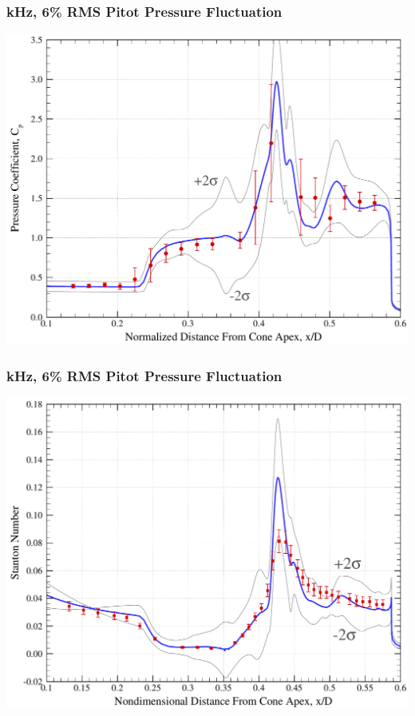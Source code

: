 \documentclass[compress,11pt]{beamer}
\begin{document}
\frame
{
\frametitle{\scriptsize \unit[25]{kHz}, 6\% RMS Pitot Pressure Fluctuation}
\begin{center}
  \includegraphics[width=.85\textwidth]{figures/aedc_double_cone/2894/Cp_25kHz_6percent}\hspace{.5em}
\end{center}
}

\frame
{
\frametitle{\scriptsize \unit[25]{kHz}, 6\% RMS Pitot Pressure Fluctuation}
\begin{center}
  \includegraphics[width=.85\textwidth]{figures/aedc_double_cone/2894/St_25kHz_6percent}
\end{center}
}
\end{document}
